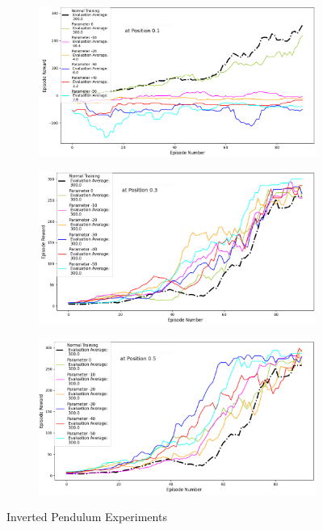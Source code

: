 \documentclass[journal]{IEEEtran}
\begin{document}
\begin{figure}
    \centering
    \begin{subfigure}[b]{0.5\textwidth}
      \centering
      \includegraphics[width=\textwidth]{Inverted_Pendulum_with_Boundary_at_0.1.png}
    \end{subfigure}
    \vspace*{0.0mm}
    \begin{subfigure}[b]{0.5\textwidth}
      \centering
      \includegraphics[width=\textwidth]{Inverted_Pendulum_with_Boundary_at_0.3.png}
    \end{subfigure}
    \vspace*{0.0mm}
    \begin{subfigure}[b]{0.5\textwidth}
      \centering
      \includegraphics[width=\textwidth]{Inverted_Pendulum_with_Boundary_at_0.5.png}
    \end{subfigure}
    \caption{Inverted Pendulum Experiments}
    \label{fig:InvertedPendulum}
\end{figure}
\end{document}

